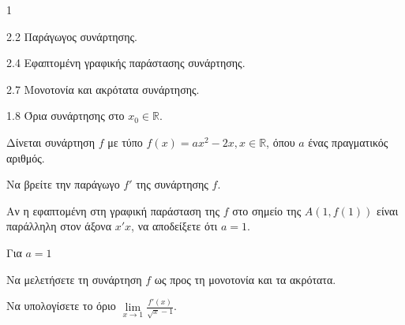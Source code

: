 \begin{ylh}{1}
    \item 2.2 Παράγωγος συνάρτησης.
    \item 2.4 Εφαπτομένη γραφικής παράστασης συνάρτησης.
    \item 2.7 Μονοτονία και ακρότατα συνάρτησης.
    \item 1.8 Όρια συνάρτησης στο $x_0 \in \mathbb{R}$.
\end{ylh}
Δίνεται συνάρτηση $f$ με τύπο $f(x) = ax^2 - 2x, x \in \mathbb{R}$, όπου $a$ ένας πραγματικός αριθμός.
\begin{alist}
    \item 
    \begin{rlist}
        \item Να βρείτε την παράγωγο $f'$ της συνάρτησης $f$. 
        \item Αν η εφαπτομένη στη γραφική παράσταση της $f$ στο σημείο της $A(1, f(1))$ είναι παράλληλη στον άξονα $x'x$, να αποδείξετε ότι $a=1$. 
    \end{rlist}
Για $a=1$
    \item Να μελετήσετε τη συνάρτηση $f$ ως προς τη μονοτονία και τα ακρότατα. 
    \item Να υπολογίσετε το όριο $\displaystyle\lim\limits_{x\to1} \frac{f'(x)}{\sqrt{x} - 1}$. 
\end{alist}

